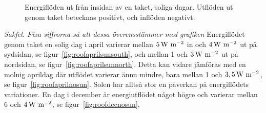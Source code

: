 \begin{figure}[hpbt]
\centering
{}

\caption{\label{fig:rooffigurescloud}Energiflöden ut från insidan av en taket, soliga dagar. Utflöden ut genom taket betecknas positivt, och inflöden negativt.}
\end{figure}

\emph{\color{red} Sakfel. Fixa siffrorna så att dessa överensstämmer med grafiken}
Energiflödet genom taket en solig dag i april varierar mellan $\unit[5]{W~m^{-2}}$ in och $\unit[4]{W~m^{-2}}$ ut på sydsidan, se figur~\ref{fig:roofaprilsunsouth}, och mellan 1 och $\unit[3]{W~m^{-2}}$ ut på nordsidan, se figur~\ref{fig:roofaprilsunnorth}. Detta kan vidare jämföras med en molnig aprildag där utflödet varierar ännu mindre, bara mellan 1 och $\unit[3,5]{W~m^{-2}}$, se figur~\ref{fig:roofaprilnosun}. Solen har alltså stor en påverkan på energiflödets variationer. En dag i december är energiutflödet något högre och varierar mellan 6 och $\unit[4]{W~m^{-2}}$, se figur~\ref{fig:roofdecnosun},


